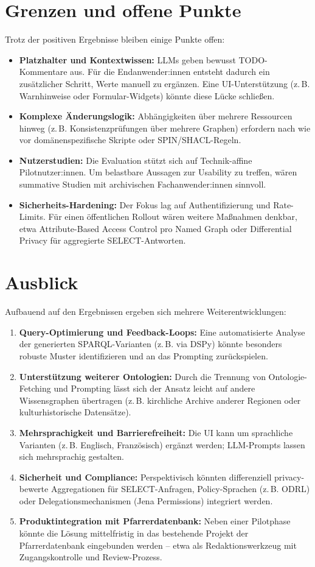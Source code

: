 \section{Grenzen und offene Punkte}
Trotz der positiven Ergebnisse bleiben einige Punkte offen:
\begin{itemize}
  \item \textbf{Platzhalter und Kontextwissen:} LLMs geben bewusst TODO-Kommentare aus. Für die Endanwender:innen entsteht dadurch ein zusätzlicher Schritt, Werte manuell zu ergänzen. Eine UI-Unterstützung (z.\,B. Warnhinweise oder Formular-Widgets) könnte diese Lücke schließen.
  \item \textbf{Komplexe Änderungslogik:} Abhängigkeiten über mehrere Ressourcen hinweg (z.\,B. Konsistenzprüfungen über mehrere Graphen) erfordern nach wie vor domänenspezifische Skripte oder SPIN/SHACL-Regeln.
  \item \textbf{Nutzerstudien:} Die Evaluation stützt sich auf Technik-affine Pilotnutzer:innen. Um belastbare Aussagen zur Usability zu treffen, wären summative Studien mit archivischen Fachanwender:innen sinnvoll.
  \item \textbf{Sicherheits-Hardening:} Der Fokus lag auf Authentifizierung und Rate-Limits. Für einen öffentlichen Rollout wären weitere Maßnahmen denkbar, etwa Attribute-Based Access Control pro Named Graph oder Differential Privacy für aggregierte SELECT-Antworten.
\end{itemize}

\section{Ausblick}
Aufbauend auf den Ergebnissen ergeben sich mehrere Weiterentwicklungen:
\begin{enumerate}
  \item \textbf{Query-Optimierung und Feedback-Loops:} Eine automatisierte Analyse der generierten SPARQL-Varianten (z.\,B. via DSPy) könnte besonders robuste Muster identifizieren und an das Prompting zurückspielen.
  \item \textbf{Unterstützung weiterer Ontologien:} Durch die Trennung von Ontologie-Fetching und Prompting lässt sich der Ansatz leicht auf andere Wissensgraphen übertragen (z.\,B. kirchliche Archive anderer Regionen oder kulturhistorische Datensätze).
  \item \textbf{Mehrsprachigkeit und Barrierefreiheit:} Die UI kann um sprachliche Varianten (z.\,B. Englisch, Französisch) ergänzt werden; LLM-Prompts lassen sich mehrsprachig gestalten.
  \item \textbf{Sicherheit und Compliance:} Perspektivisch könnten differenziell privacy-bewerte Aggregationen für SELECT-Anfragen, Policy-Sprachen (z.\,B. ODRL) oder Delegationsmechanismen (Jena Permissions) integriert werden.
  \item \textbf{Produktintegration mit Pfarrerdatenbank:} Neben einer Pilotphase könnte die Lösung mittelfristig in das bestehende Projekt der Pfarrerdatenbank eingebunden werden – etwa als Redaktionswerkzeug mit Zugangskontrolle und Review-Prozess.
\end{enumerate}

